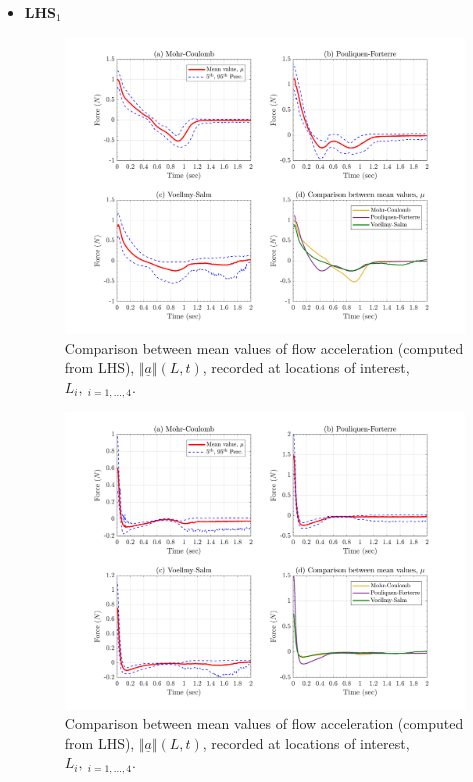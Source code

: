 \documentclass{article}
\begin{document}
\begin{itemize}
\item	\textbf{LHS$_1$}

\begin{figure}[H]
        \centering
        \includegraphics[width=1\textwidth]{InclinedPlane/Forces_Powers/LHS1/FLHS1x.png}
        \caption{Comparison between mean values of flow acceleration (computed from LHS), $\Vert \underline{a} \Vert(L,t)$, recorded at locations of interest, $L_i, \ _{i=1,...,4}$.}
        \label{fig:Ramp-LHS1-Fx-spatial}
\end{figure}

\begin{figure}[H]
        \centering
        \includegraphics[width=1\textwidth]{InclinedPlane/Forces_Powers/LHS1/FLHS1y.png}
        \caption{Comparison between mean values of flow acceleration (computed from LHS), $\Vert \underline{a} \Vert(L,t)$, recorded at locations of interest, $L_i, \ _{i=1,...,4}$.}
        \label{fig:Ramp-LHS1-Fy-spatial}
\end{figure}


\end{itemize}
\end{document}
